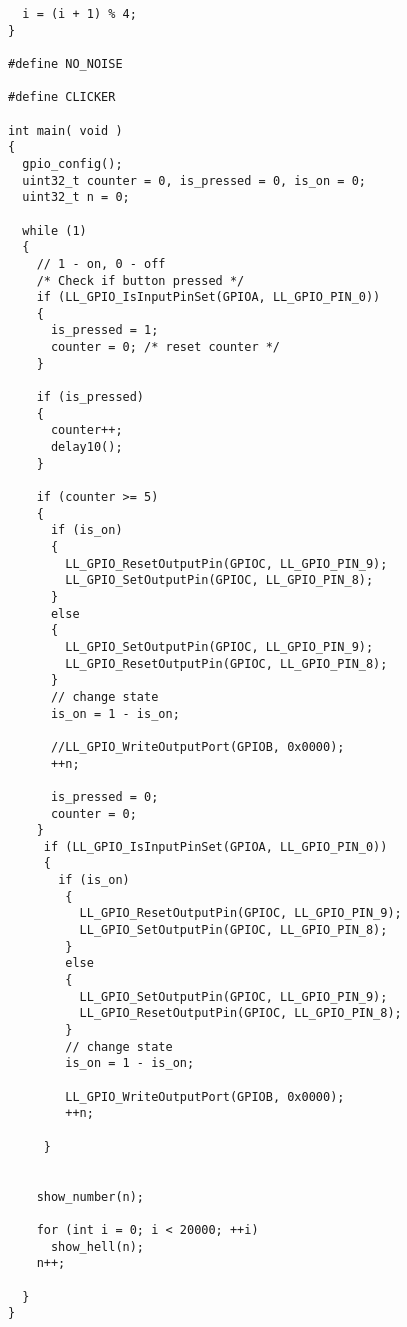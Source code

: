 \begin{verbatim}
  i = (i + 1) % 4;
}

#define NO_NOISE

#define CLICKER

int main( void )
{ 
  gpio_config();
  uint32_t counter = 0, is_pressed = 0, is_on = 0;
  uint32_t n = 0;
  
  while (1)
  {
    // 1 - on, 0 - off
    /* Check if button pressed */
    if (LL_GPIO_IsInputPinSet(GPIOA, LL_GPIO_PIN_0))
    {
      is_pressed = 1; 
      counter = 0; /* reset counter */
    }
   
    if (is_pressed)
    {
      counter++;
      delay10();
    }
    
    if (counter >= 5)
    {
      if (is_on)
      {
        LL_GPIO_ResetOutputPin(GPIOC, LL_GPIO_PIN_9);
        LL_GPIO_SetOutputPin(GPIOC, LL_GPIO_PIN_8);
      }
      else
      {
        LL_GPIO_SetOutputPin(GPIOC, LL_GPIO_PIN_9);
        LL_GPIO_ResetOutputPin(GPIOC, LL_GPIO_PIN_8);
      }
      // change state
      is_on = 1 - is_on;
    
      //LL_GPIO_WriteOutputPort(GPIOB, 0x0000);
      ++n;
      
      is_pressed = 0;
      counter = 0;
    }
     if (LL_GPIO_IsInputPinSet(GPIOA, LL_GPIO_PIN_0)) 
     {
       if (is_on)
        {
          LL_GPIO_ResetOutputPin(GPIOC, LL_GPIO_PIN_9);
          LL_GPIO_SetOutputPin(GPIOC, LL_GPIO_PIN_8);
        }
        else
        {
          LL_GPIO_SetOutputPin(GPIOC, LL_GPIO_PIN_9);
          LL_GPIO_ResetOutputPin(GPIOC, LL_GPIO_PIN_8);
        }
        // change state
        is_on = 1 - is_on;

        LL_GPIO_WriteOutputPort(GPIOB, 0x0000);
        ++n;

     }
    

    show_number(n);

    for (int i = 0; i < 20000; ++i)
      show_hell(n);
    n++;

  }
}

\end{verbatim}